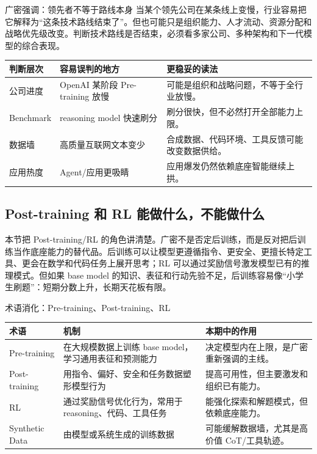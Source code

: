 \documentclass[a4paper]{article}
\begin{document}
\begin{importantbox}{广密强调：领先者不等于路线本身}
当某个领先公司在某条线上变慢，行业容易把它解释为“这条技术路线结束了”。但也可能只是组织能力、人才流动、资源分配和战略优先级改变。判断技术路线是否结束，必须看多家公司、多种架构和下一代模型的综合表现。
\end{importantbox}

\noindent\begin{tabularx}{\textwidth}{p{}p{}X}
\toprule
判断层次 & 容易误判的地方 & 更稳妥的读法 \\
\midrule
公司进度 & OpenAI 某阶段 Pre-training 放慢 & 可能是组织和战略问题，不等于全行业放慢。 \\
Benchmark & reasoning model 快速刷分 & 刷分很快，但不必然打开全部能力上限。 \\
数据墙 & 高质量互联网文本变少 & 合成数据、代码环境、工具反馈可能改变数据供给。 \\
应用热度 & Agent/应用更吸睛 & 应用爆发仍然依赖底座智能继续上拱。 \\
\bottomrule
\end{tabularx}

\subsection{Post-training 和 RL 能做什么，不能做什么}

本节把 Post-training/RL 的角色讲清楚。广密不是否定后训练，而是反对把后训练当作底座能力的替代品。后训练可以让模型更遵循指令、更安全、更擅长特定工具、更会在数学和代码任务上展开思考；RL 可以通过奖励信号激发模型已有的推理模式。但如果 base model 的知识、表征和行动先验不足，后训练容易像“小学生刷题”：短期分数上升，长期天花板有限。

\begin{knowledgebox}{术语消化：Pre-training、Post-training、RL}
\noindent\begin{tabularx}{\textwidth}{p{}p{}X}
\toprule
术语 & 机制 & 本期中的作用 \\
\midrule
Pre-training & 在大规模数据上训练 base model，学习通用表征和预测能力 & 决定模型内在上限，是广密重新强调的主线。 \\
Post-training & 用指令、偏好、安全和任务数据塑形模型行为 & 提高可用性，但主要激发和组织已有能力。 \\
RL & 通过奖励信号优化行为，常用于 reasoning、代码、工具任务 & 能强化探索和解题模式，但依赖底座能力。 \\
Synthetic Data & 由模型或系统生成的训练数据 & 可能缓解数据墙，尤其是高价值 CoT/工具轨迹。 \\
\bottomrule
\end{tabularx}
\end{knowledgebox}
\end{document}
